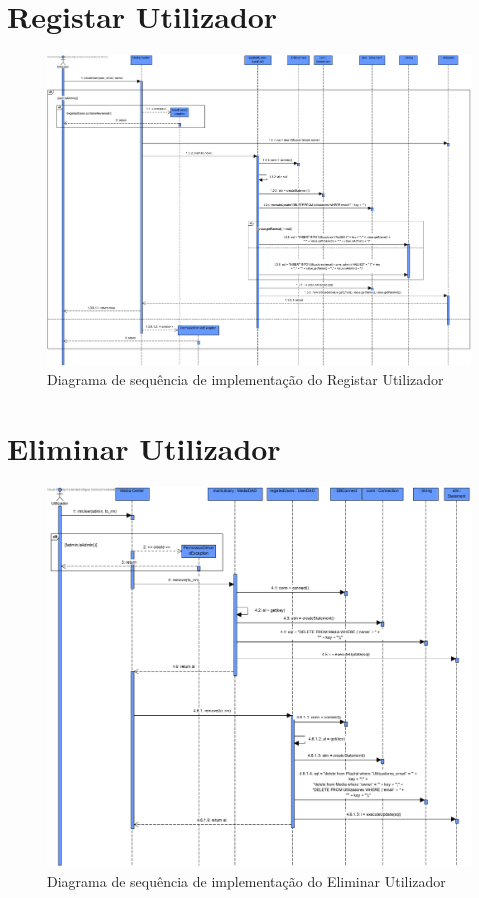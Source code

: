 \documentclass[a4paper]{report}
\begin{document}
\section{Registar Utilizador}
\begin{figure}[H]
	\centering 
    \includegraphics[width=\textwidth]{images/criarUserImp.png}  
    \caption{Diagrama de sequência de implementação do Registar Utilizador}
\end{figure}

\section{Eliminar Utilizador}
\begin{figure}[H]
	\centering 
    \includegraphics[width=\textwidth]{images/remUserImp.png}  
    \caption{Diagrama de sequência de implementação do Eliminar Utilizador}
\end{figure}
\end{document}
